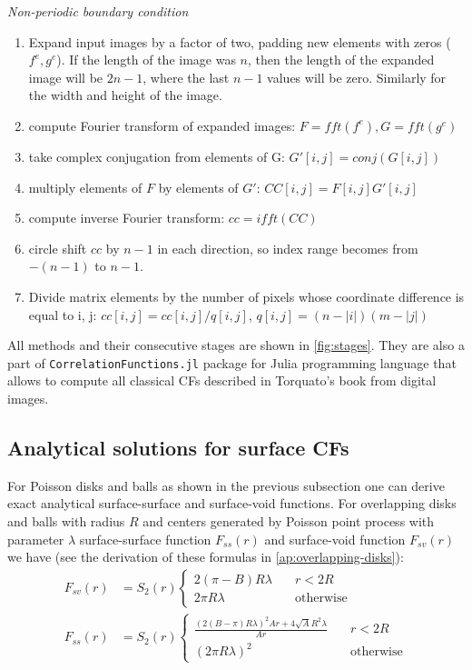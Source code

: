 \documentclass[reprint,amsmath,amssymb,aps,pre]{revtex4-1}
\newcommand{\code}[1]{\colorbox{light-gray}{\texttt{#1}}}
\begin{document}
\textit{Non-periodic boundary condition}
\begin{enumerate}
    \item Expand input images by a factor of two, padding new elements with zeros ($f^e, g^e$). If the length of the image was $n$, then the length of the expanded image will be $2n - 1$, where the last $n - 1$ values will be zero. Similarly for the width and height of the image.
    \item compute Fourier transform of expanded images: $F = fft(f^e), G = fft(g^e)$
    \item take complex conjugation from elements of G: $G'[i, j] = conj(G[i, j])$
    \item multiply elements of $F$ by elements of $G'$: $CC[i, j] = F[i, j] G'[i, j]$
    \item compute inverse Fourier transform: $cc = ifft(CC)$
    \item circle shift $cc$ by $n - 1$ in each direction, so index range becomes from $-(n - 1)$ to $n - 1$.
    \item Divide matrix elements by the number of pixels whose coordinate difference is equal to i, j: $cc[i, j] = cc[i, j] / q[i, j]$, $q[i, j] = (n - |i|)(m - |j|)$
\end{enumerate}

All methods and their consecutive stages are shown in \cref{fig:stages}. They
are also a part of \code{CorrelationFunctions.jl} package \cite{ourpapaer} for
Julia programming language that allows to compute all classical CFs described in
Torquato’s book \cite{Torq_book} from digital images.

\subsection{Analytical solutions for surface CFs}
For Poisson disks and balls as shown in the previous subsection one can derive
exact analytical surface-surface and surface-void functions. For overlapping
disks and balls with radius $R$ and centers generated by Poisson point process
with parameter $\lambda$ surface-surface function $F_{ss}(r)$ and surface-void
function $F_{sv}(r)$ we have (see the derivation of these formulas in
\cref{ap:overlapping-disks}):
\begin{align}
  F_{sv}(r) &= S_2(r) \left\{
  \begin{array}{ll}
    2(\pi - B)R \lambda & \quad r<2R \\
    2\pi R \lambda & \quad \text{otherwise}
  \end{array} \right. \label{eq:fsv_final} \\
  F_{ss}(r) &= S_2(r) \left\{
  \begin{array}{ll}
    \frac{(2(B-\pi)R\lambda)^2Ar + 4\sqrt{A}R^2\lambda}{Ar} & \quad r<2R \\
    (2\pi R\lambda)^2 & \quad \text{otherwise}
  \end{array} \right. \label{eq:fss_final}
\end{align}
\end{document}
